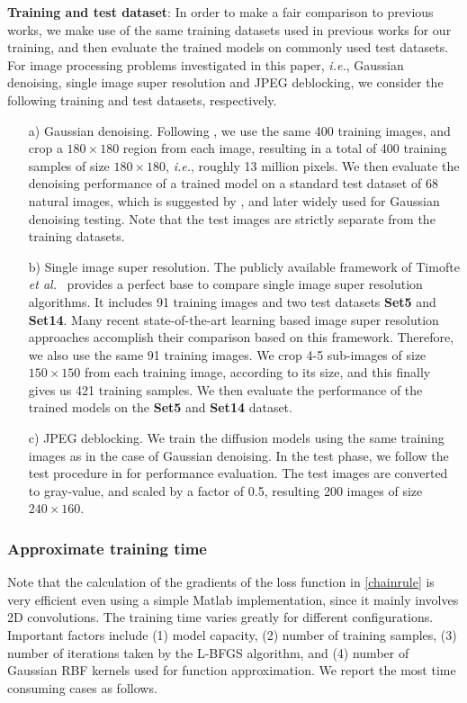 \documentclass[10pt,journal,compsoc]{IEEEtran}
\newcommand{\etal}{\emph{et al.}}
\newcommand{\ie}{\emph{i.e.}}
\begin{document}
\noindent \textbf{Training and test dataset}: 
In order to make a fair comparison to previous works, we make use of the same training datasets used in previous works for 
our training, and then evaluate the trained models on commonly used test datasets. For image processing problems 
investigated in this paper, \ie, Gaussian denoising, single image super resolution and JPEG deblocking, we consider the following 
training and test datasets, respectively. 
\begin{itemize}[leftmargin=*]
\setlength\itemsep{0em}
    \item[a)] \noindent Gaussian denoising. Following \cite{CSF2014}, we use the same 400 training images, 
and crop a $180 \times 180$ region from each image, resulting in a total of 400 training samples 
of size $180 \times 180$, \ie, roughly 13 million pixels. We then evaluate the denoising performance of a trained model 
on a standard test dataset of 68 natural images, which is suggested by \cite{RothFOE2009}, and later widely used for Gaussian 
denoising testing. Note that the test images are 
strictly separate from the training datasets. 
    \item[b)] Single image super resolution. 
The publicly available framework of Timofte \etal ~\cite{ANR} provides a perfect base to 
compare single image super resolution algorithms. It includes 91 training images and two test datasets \textbf{Set5} and 
\textbf{Set14}. Many recent state-of-the-art learning based image super resolution approaches \cite{schulter15, SRCNN} 
accomplish their comparison 
based on this framework. Therefore, we also use the same 91 training images. We crop 4-5 
sub-images of size $150 \times 150$ from each training image, according to its size, and this finally gives us 421 training samples. 
We then evaluate the performance of the trained models on the \textbf{Set5} and \textbf{Set14} dataset. 
    \item[c)] JPEG deblocking. We train the diffusion models using the same training images as in the case of Gaussian denoising. 
In the test phase, we follow the test procedure in \cite{ECCV2012RTF} for performance evaluation. 
The test images are converted to gray-value, and scaled by a factor of 0.5, resulting 200 images of size $240 \times 160$. 
\end{itemize}

\subsubsection{Approximate training time}
Note that the calculation of the gradients of the loss function in \eqref{chainrule} 
is very efficient even using 
a simple Matlab implementation, 
since it mainly involves 2D convolutions. The training time 
varies greatly for different configurations. Important factors include (1) model capacity, (2) number of training samples, 
(3) number of iterations taken by the L-BFGS algorithm, 
and (4) number of Gaussian RBF kernels used for function approximation. 
We report the most time consuming cases as follows. 
\end{document}

